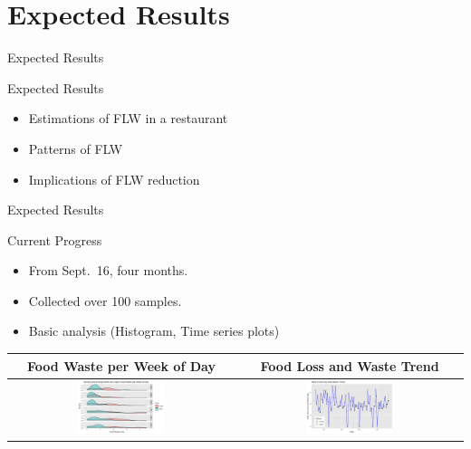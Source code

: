 \documentclass[
  ignorenonframetext,
]{beamer}
\providecommand{\tightlist}{%
  \setlength{\itemsep}{0pt}\setlength{\parskip}{0pt}}
\begin{document}
\hypertarget{expected-results}{%
\section{Expected Results}\label{expected-results}}

\begin{frame}{Expected Results}
\protect\hypertarget{expected-results-1}{}
\begin{block}{Expected Results}
\protect\hypertarget{expected-results-2}{}
\begin{itemize}
\tightlist
\item
  Estimations of FLW in a restaurant
\item
  Patterns of FLW
\item
  Implications of FLW reduction
\end{itemize}
\end{block}
\end{frame}

\begin{frame}{Expected Results}
\protect\hypertarget{expected-results-3}{}
\begin{block}{Current Progress}
\protect\hypertarget{current-progress}{}
\begin{itemize}
\tightlist
\item
  From Sept.~16, four months.
\item
  Collected over 100 samples.
\item
  Basic analysis (Histogram, Time series plots)
\end{itemize}

\begin{longtable}[]{@{}cc@{}}
\toprule()
Food Waste per Week of Day & Food Loss and Waste Trend \\
\midrule()
\endhead
\includegraphics[width=0.4\textwidth,height=\textheight]{weekFW.png} &
\includegraphics[width=0.4\textwidth,height=\textheight]{tsFLW.png} \\
\bottomrule()
\end{longtable}
\end{block}
\end{frame}
\end{document}
